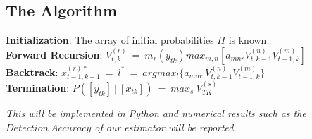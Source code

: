 \documentclass[12pt, draftcls, onecolumn]{IEEEtran}
\begin{document}
\subsection{The Algorithm}
\begin{flushleft}
\textbf{Initialization}: The array of initial probabilities $\Pi$ is known.
\\\textbf{Forward Recursion}: $V_{t,k}^{(r)}\ =\ m_r(y_{tk})max_{m,n}[a_{mnr}V_{t,k-1}^{(n)}V_{t-1,k}^{(m)}]$
\\\textbf{Backtrack}: $x_{t-1,k-1}^{(r)*}\ =\ l^*\ =\ argmax_{l}\{a_{mnr}\ V_{t,k-1}^{(n)}V_{t-1,k}^{(m)}\}$
\\\textbf{Termination}: $P([y_{tk}]\ |\ [x_{tk}])\ =\ max_s\ V_{TK}^{(s)}$
\end{flushleft}
\textit{This will be implemented in Python and numerical results such as the $Detection\ Accuracy$ of our estimator will be reported}.
\end{document}
